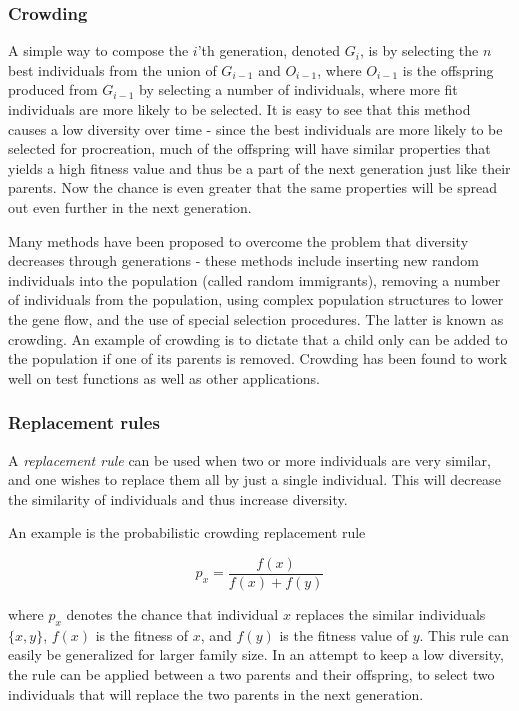 \subsubsection{Crowding}
\label{sec:crowding} 
A simple way to compose the $i$'th generation, denoted $G_i$, is by selecting the $n$ best individuals from the union of $G_{i-1}$ and $O_{i-1}$, where $O_{i-1}$ is the offspring produced from $G_{i-1}$ by selecting a number of individuals, where more fit individuals are more likely to be selected.
It is easy to see that this method causes a low diversity over time - since the best individuals are more likely to be selected for procreation, much of the offspring will have similar properties that yields a high fitness value and thus be a part of the next generation just like their parents. Now the chance is even greater that the same properties will be spread out even further in the next generation.

Many methods have been proposed to overcome the problem that diversity decreases through generations - these methods include inserting new random individuals into the population (called random immigrants), removing a number of individuals from the population, using complex population structures to lower the gene flow, and the use of special selection procedures\cite{ursem2002diversity}. The latter is known as crowding. 
An example of crowding is to dictate that a child only can be added to the population if one of its parents is removed.
Crowding has been found to work well on test functions as well as other applications\cite{crowding}. 

\subsubsection{Replacement rules}
A \emph{replacement rule} can be used when two or more individuals are very similar, and one wishes to replace them all by just a single individual. This will decrease the similarity of individuals and thus increase diversity.

An example is the probabilistic crowding replacement rule\cite{Mengshoel_and_Goldberg:1999}

\[p_x = \frac{f(x)}{f(x)+f(y)}\]

where $p_x$ denotes the chance that individual $x$ replaces the similar individuals $\{x, y\}$, $f(x)$ is the fitness of $x$, and $f(y)$ is the fitness value of $y$. This rule can easily be generalized for larger family size. 
In an attempt to keep a low diversity, the rule can be applied between a two parents and their offspring, to select two individuals that will replace the two parents in the next generation.













